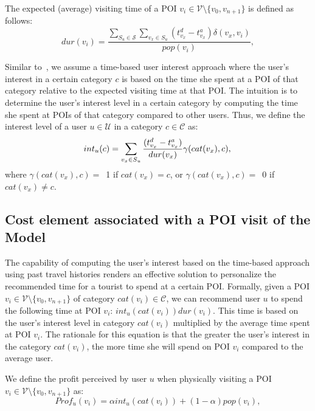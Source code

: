 The expected (average) visiting time of a POI $v_i \in \mathcal{V} \setminus \{v_{0}, v_{n+1}\}$ is defined as follows:
\begin{equation}
\label{eq:dur}
dur(v_{i}) = \frac{\sum\limits_{S_u \in \mathcal{S}} \sum\limits_{v_{x} \in S_u} (t_{v_x}^d - t_{v_x}^a)\delta(v_{x},v_{i})}{pop(v_{i})},
\end{equation}

Similar to~\cite{lim-personalized:18}, we assume a time-based user interest approach where the user's interest in a certain category $c$ is based on the time she spent at a POI of that category relative to the expected visiting time at that POI. The intuition is to determine the user's interest level in a certain category by computing the time she spent at POIs of that category compared to other users. Thus, we define the interest level of a user $u \in \mathcal{U}$ in a category $c \in \mathcal{C}$ as:
\begin{equation}
\label{eq:intu}
     int_u(c) = \sum\limits_{v_{x} \in S_u} \frac{(t_{v_x}^d - t_{v_x}^a)}{dur(v_{x})} \gamma(cat(v_x),c), \\
\end{equation}
where $\gamma(cat(v_{x}),c)=$~1 if $cat(v_x)=c$, or $\gamma(cat(v_{x}),c)=$~0 if $cat(v_x) \neq c$.

\subsection{{Cost element associated with a POI visit of the Model}}
\label{sec:model-3}

The capability of computing the user's interest based on the time-based approach using past travel histories renders an effective solution to personalize the recommended time for a tourist to spend at a certain POI. Formally, given a POI $v_{i} \in \mathcal{V} \setminus \{v_{0}, v_{n+1}\}$ of category $cat(v_i) \in \mathcal{C}$, we can recommend user $u$ to spend the following time at POI $v_{i}$: $int_u(cat(v_i))dur(v_{i})$. 
This time is based on the user's interest level in category $cat(v_i)$ multiplied by the average time spent at POI $v_i$. The rationale for this equation is that the greater the user's interest in the category $cat(v_i)$, the more time she will spend on POI $v_i$ compared to the average user. 

We define the profit perceived by user $u$ when physically visiting a POI $v_i \in \mathcal{V} \setminus \{v_{0}, v_{n+1}\}$ as: 
\begin{equation}
\label{eq:prof_vi}
Prof_{u}(v_i) = \alpha int_u(cat(v_i)) + (1 - \alpha)pop(v_{i}),
\end{equation}

